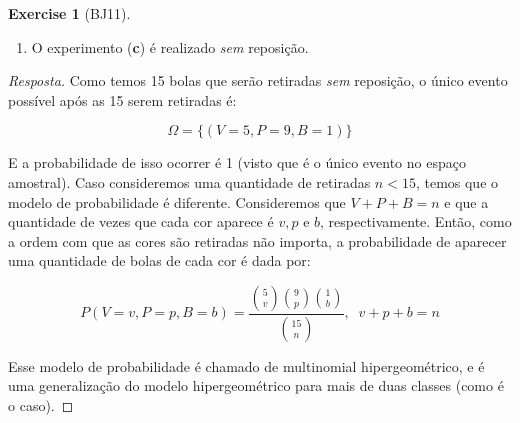 \documentclass[
]{article}
\providecommand{\tightlist}{%
  \setlength{\itemsep}{0pt}\setlength{\parskip}{0pt}}
\theoremstyle{definition}
\theoremstyle{definition}
\theoremstyle{definition}
\newtheorem{exercise}{Exercise}[section]
\theoremstyle{definition}
\theoremstyle{remark}
\begin{document}
\begin{exercise}[BJ11]
\begin{enumerate}
\def\labelenumi{\alph{enumi})}
\setcounter{enumi}{3}
\tightlist
\item
  O experimento (\textbf{c}) é realizado \emph{sem} reposição.
\end{enumerate}

\begin{proof}[Resposta]
Como temos 15 bolas que serão retiradas \emph{sem} reposição, o único evento possível após as 15 serem retiradas é:

\begin{equation*}
\Omega = \{(V=5,P=9,B=1)\}
\end{equation*}

E a probabilidade de isso ocorrer é 1 (visto que é o único evento no espaço amostral). Caso consideremos uma quantidade de retiradas \(n < 15\), temos que o modelo de probabilidade é diferente. Consideremos que \(V + P + B = n\) e que a quantidade de vezes que cada cor aparece é \(v,p\) e \(b\), respectivamente. Então, como a ordem com que as cores são retiradas não importa, a probabilidade de aparecer uma quantidade de bolas de cada cor é dada por:

\begin{equation*}
P(V=v,P=p,B=b) = \frac{\binom{5}{v}\binom{9}{p}\binom{1}{b}}{\binom{15}{n}}, \;\; v+p+b = n
\end{equation*}

Esse modelo de probabilidade é chamado de multinomial hipergeométrico, e é uma generalização do modelo hipergeométrico para mais de duas classes (como é o caso).
\end{proof}

\end{exercise}
\end{document}
